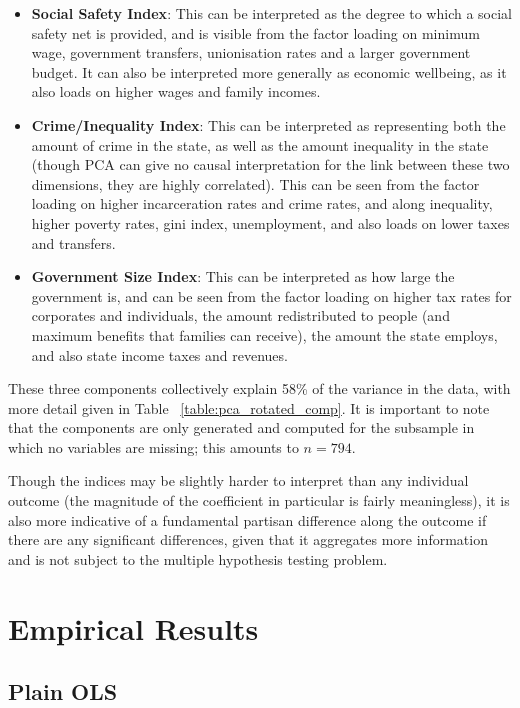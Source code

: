 \documentclass{article}
\begin{document}
\begin{itemize}
\item \textbf{Social Safety Index}: This can be interpreted as the degree to which a social safety net is provided, and is visible from the factor loading on minimum wage, government transfers, unionisation rates and a larger government budget. It can also be interpreted more generally as economic wellbeing, as it also loads on higher wages and family incomes.

\item \textbf{Crime/Inequality Index}: This can be interpreted as representing both the amount of crime in the state, as well as the amount inequality in the state (though PCA can give no causal interpretation for the link between these two dimensions, they are highly correlated). This can be seen from the factor loading on higher incarceration rates and crime rates, and along inequality, higher poverty rates, gini index, unemployment, and also loads on lower taxes and transfers.

\item \textbf{Government Size Index}: This can be interpreted as how large the government is, and can be seen from the factor loading on higher tax rates for corporates and individuals, the amount redistributed to people (and maximum benefits that families can receive), the amount the state employs, and also state income taxes and revenues.
\end{itemize} 

These three components collectively explain 58\% of the variance in the data, with more detail given in Table ~\ref{table:pca_rotated_comp}. It is important to note that the components are only generated and computed for the subsample in which no variables are missing; this amounts to $n = 794$.

Though the indices may be slightly harder to interpret than any individual outcome (the magnitude of the coefficient in particular is fairly meaningless), it is also more indicative of a fundamental partisan difference along the outcome if there are any significant differences, given that it aggregates more information and is not subject to the multiple hypothesis testing problem.

\section{Empirical Results}

\subsection{Plain OLS}
\end{document}
